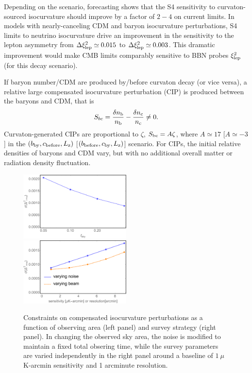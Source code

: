 Depending on the scenario, forecasting shows that the S4 sensitivity to curvaton-sourced isocurvature should improve by a factor of $2-4$ on current limits. In models with nearly-canceling CDM and baryon isocurvature perturbations, S4 limits to neutrino isocurvature drive an improvement in the sensitivity to the lepton asymmetry from $\Delta \xi_{\rm lep}^{2}\simeq 0.015$ to $\Delta \xi_{\rm lep}^{2}\simeq 0.003$. This dramatic improvement would make CMB limits comparably sensitive to BBN probes $\xi_{\rm lep}^{2}$ (for this decay scenario).

If baryon number/CDM are produced by/before curvaton decay (or vice versa), a relative large compensated isocurvature perturbation (CIP) is produced between the baryons and CDM, that is
\begin{equation}
S_{bc}=\frac{\delta n_{\rm b}}{n_{\rm b}}-\frac{\delta n_{\rm c}}{n_{\rm c}}\neq 0.
\end{equation} Curvaton-generated CIPs are proportional to $\zeta$, $S_{\rm bc}=A\zeta$, where $A\simeq 17$ [$A\simeq -3$] in the $(b_{\rm by}, c_{\rm before}, L_{\rm z})$ [$(b_{\rm before}, c_{\rm by}, L_{\rm z})$] scenario. For CIPs, the initial relative densities of baryons and CDM vary, but with no additional overall matter or radiation density fluctuation.

\begin{figure}[htbp!]
\includegraphics[width=0.5\textwidth]{Inflation/S4CIPsfsky.pdf}
 \includegraphics[width=0.5\textwidth]{Inflation/S4CIPsNoise.pdf}
 \caption{Constraints on compensated isocurvature perturbations as a function of observing area (left panel) and survey strategy (right panel). In changing the observed sky area, the noise is modified to maintain a fixed total obsering time, while the survey parameters are varied independently in the right panel around a baseline of $1~\mu$K-arcmin sensitivity and 1 arcminute resolution.
\label{fig:CIPs_kovetz}}
\end{figure} 

